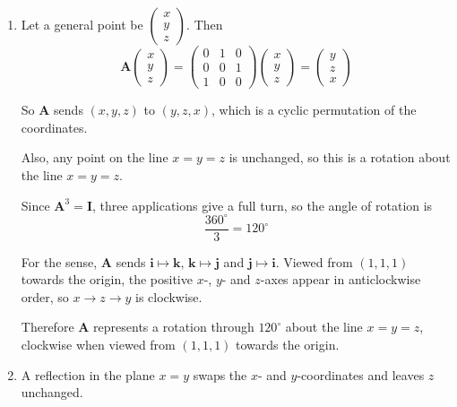\documentclass[leqno]{article}
\begin{document}
\begin{enumerate}[
  label=\textbf{\arabic*.},
  leftmargin=*,
  topsep=0pt,
  partopsep=0pt,
  parsep=0pt
]
\begin{djsSolution}
\begin{enumerate}[label=\textbf{(\alph*)}]
So
\[
\mathbf{A}^5=\mathbf{A}^3\mathbf{A}^2=\mathbf{I}\mathbf{A}^2=\mathbf{A}^2
\]

Hence
\[
\mathbf{A}^5=
\begin{pmatrix}
0 & 0 & 1\\
1 & 0 & 0\\
0 & 1 & 0
\end{pmatrix}
\]

  \item Let a general point be \(\begin{pmatrix}x\\y\\z\end{pmatrix}\). Then
\[
\mathbf{A}\begin{pmatrix}x\\y\\z\end{pmatrix}
=
\begin{pmatrix}
0 & 1 & 0\\
0 & 0 & 1\\
1 & 0 & 0
\end{pmatrix}
\begin{pmatrix}x\\y\\z\end{pmatrix}
=
\begin{pmatrix}y\\z\\x\end{pmatrix}
\]

So \(\mathbf{A}\) sends \((x,y,z)\) to \((y,z,x)\), which is a cyclic permutation of the coordinates.

Also, any point on the line \(x=y=z\) is unchanged, so this is a rotation about the line \(x=y=z\).

Since \(\mathbf{A}^3=\mathbf{I}\), three applications give a full turn, so the angle of rotation is
\[
\frac{360^\circ}{3}=120^\circ
\]

For the sense, \(\mathbf{A}\) sends \(\mathbf{i}\mapsto\mathbf{k}\), \(\mathbf{k}\mapsto\mathbf{j}\) and \(\mathbf{j}\mapsto\mathbf{i}\). Viewed from \((1,1,1)\) towards the origin, the positive \(x\)-, \(y\)- and \(z\)-axes appear in anticlockwise order, so \(x\to z\to y\) is clockwise.

Therefore \(\mathbf{A}\) represents a rotation through \(120^\circ\) about the line \(x=y=z\), clockwise when viewed from \((1,1,1)\) towards the origin.

  \item A reflection in the plane \(x=y\) swaps the \(x\)- and \(y\)-coordinates and leaves \(z\) unchanged.


\end{enumerate}
\end{djsSolution}
\end{enumerate}
\end{document}
